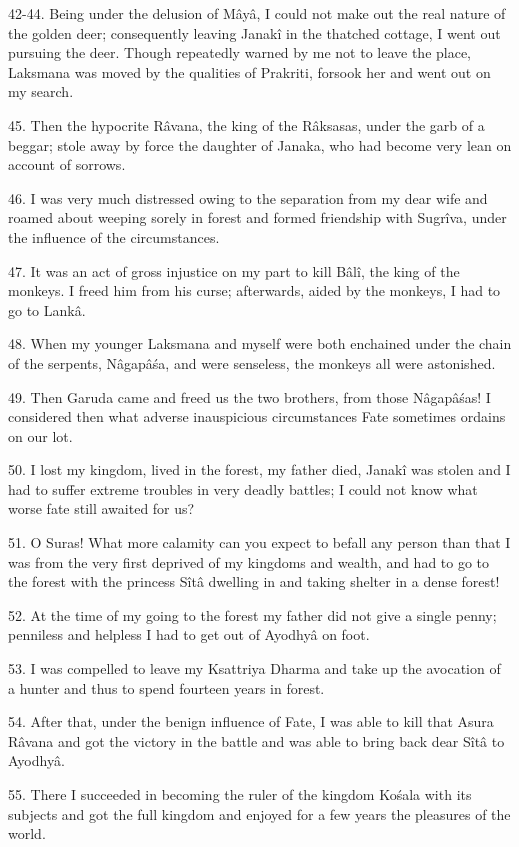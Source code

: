 42-44. Being under the delusion of M\^ay\^a, I could not make out the real nature of the golden deer; consequently leaving Janak\^i in the thatched cottage, I went out pursuing the deer. Though repeatedly warned by me not to leave the place, Laksmana was moved by the qualities of Prakriti, forsook her and went out on my search.

45. Then the hypocrite R\^avana, the king of the R\^aksasas, under the garb of a beggar; stole away by force the daughter of Janaka, who had become very lean on account of sorrows.

46. I was very much distressed owing to the separation from my dear wife and roamed about weeping sorely in forest and formed friendship with Sugr\^iva, under the influence of the circumstances.

47. It was an act of gross injustice on my part to kill B\^al\^i, the king of the monkeys. I freed him from his curse; afterwards, aided by the monkeys, I had to go to Lank\^a.

48. When my younger Laksmana and myself were both enchained under the chain of the serpents, N\^agap\^a\'sa, and were senseless, the monkeys all were astonished.

49. Then Garuda came and freed us the two brothers, from those N\^agap\^a\'sas! I considered then what adverse inauspicious circumstances Fate sometimes ordains on our lot.

50. I lost my kingdom, lived in the forest, my father died, Janak\^i was stolen and I had to suffer extreme troubles in very deadly battles; I could not know what worse fate still awaited for us?

51. O Suras! What more calamity can you expect to befall any person than that I was from the very first deprived of my kingdoms and wealth, and had to go to the forest with the princess S\^it\^a dwelling in and taking shelter in a dense forest!

52. At the time of my going to the forest my father did not give a single penny; penniless and helpless I had to get out of Ayodhy\^a on foot.

53. I was compelled to leave my Ksattriya Dharma and take up the avocation of a hunter and thus to spend fourteen years in forest.

54. After that, under the benign influence of Fate, I was able to kill that Asura R\^avana and got the victory in the battle and was able to bring back dear S\^it\^a to Ayodhy\^a.

55. There I succeeded in becoming the ruler of the kingdom Ko\'sala with its subjects and got the full kingdom and enjoyed for a few years the pleasures of the world.

